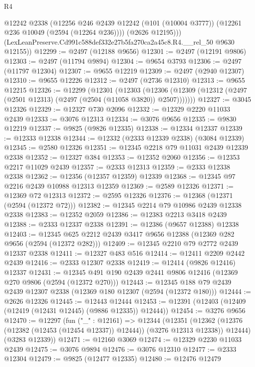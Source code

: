 \begin{lexlean}{R4}
\begin{coremodule}
          @12242
          @2338
          (@12256
            @246
            @2439
            @12242
            (@101 (@10004 @3777))
            (@12261 @236 @10049 (@2594 (@12264 @236))))
          (@2626 @12195)))
      (LexLeanPreserve.Cd991c588def332e27b5fa270ca2a45c8.R4.__rel_50 @9630 @12155))
@12299 := @2497 (@12188 @9656)
@12301 := @2497 (@12191 @9806)
@12303 := @2497 (@11794 @9894)
@12304 := @9654 @3793
@12306 := @2497 (@11797 @12304)
@12307 := @9655 @12219
@12309 := @2497 (@2940 @12307)
@12310 := @9655 @12226
@12312 := @2497 (@2736 @12310)
@12313 := @9655 @12215
@12326 := @12299
    (@12301
      (@12303
        (@12306 (@12309 (@12312 (@2497 (@2501 @12313) (@2497 (@2504 (@11058 @3820)) @2507)))))))
@12327 := @3045 @12326
@12329 := @12327 @730 @2096
@12332 := @12329 @2220 @11033 @2439
@12333 := @3076 @12313
@12334 := @3076 @9656
@12335 := @9830 @12219
@12337 := @9825 (@9826 @12335)
@12338 := @12334 @12337
@12339 := @12333 @12338
@12344 := @12332 (@2333 @12339 @2338) (@3084 @12339)
@12345 := @2580 @12326
@12351 := @12345 @2218 @79 @11031 @2439 @12339 @2338
@12352 := @12327 @384
@12353 := @12352 @2060
@12356 := @12353 @2217 @11029 @2439
@12357 := @2333 @12313
@12359 := @2333 @12338 @2338
@12362 := @12356 (@12357 @12359) @12339
@12368 := @12345 @97 @2216 @2439 @10988 @12313 @12359
@12369 := @2589 @12326
@12371 := @12369 @72 @12313
@12372 := @2595 @12326
@12376 := @12368 (@12371 (@2594 (@12372 @72)))
@12382 := @12345 @2214 @79 @10986 @2439 @12338 @2338
@12383 := @12352 @2059
@12386 := @12383 @2213 @3418 @2439
@12388 := @2333 @12337 @2338
@12391 := @12386 (@9657 @12388) @12338
@12403 := @12345 @625 @2212 @2439 @3417 @9656 @12388 (@12369 @282 @9656 (@2594 (@12372 @282)))
@12409 := @12345 @2210 @79 @2772 @2439 @12337 @2338
@12411 := @12327 @483 @516
@12414 := @12411 @2209 @2442 @2439
@12416 := @2333 @12307 @2338
@12419 := @12414 (@9826 @12416) @12337
@12431 := @12345 @491 @190 @2439 @2441 @9806 @12416 (@12369 @270 @9806 (@2594 (@12372 @270)))
@12443 := @12345 @188 @79 @2439 @2439 @12307 @2338 (@12369 @180 @12307 (@2594 (@12372 @180)))
@12444 := @2626 @12326
@12445 := @12443 @12444
@12453 := @12391 (@12403 (@12409 (@12419 (@12431 @12445) (@9886 @12335)) @12444))
@12454 := @3276 @9656
@12470 := @12297
    (fun ("_" : @12161) =>
    @12344
      (@12351
        (@12362 (@12376 (@12382 (@12453 (@12454 @12337)) @12444)) (@3276 @12313 @12338))
        @12444)
      (@3283 @12339))
@12471 := @12160 @3069
@12474 := @12329 @2230 @11033 @2439
@12475 := @3076 @9894
@12476 := @3076 @12310
@12477 := @2333 @12304
@12479 := @9825 (@12477 @12335)
@12480 := @12476 @12479

\end{coremodule}
\end{lexlean}
